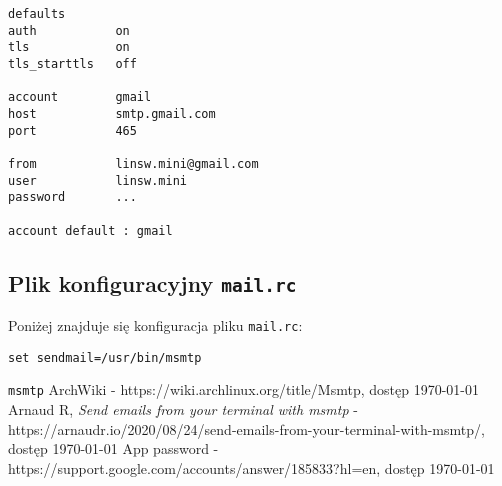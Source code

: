 \documentclass{article}
\begin{document}
\begin{lstlisting}[language=msmtprc, caption=Plik konfiguracyjny \texttt{msmtp}., label=lst:msmtprc]
defaults
auth           on
tls            on
tls_starttls   off

account        gmail
host           smtp.gmail.com
port           465

from           linsw.mini@gmail.com
user           linsw.mini
password       ...

account default : gmail
\end{lstlisting}

\subsection{Plik konfiguracyjny \texttt{mail.rc}}

Poniżej znajduje się konfiguracja pliku \texttt{mail.rc}:

\begin{lstlisting}[language=msmtprc, caption=Plik konfiguracyjny \texttt{mail.rc}., label=lst:mailrc]
set sendmail=/usr/bin/msmtp
\end{lstlisting}


\begin{thebibliography}{9}
 \texttt{msmtp} ArchWiki - https://wiki.archlinux.org/title/Msmtp, dostęp \today
{} Arnaud R, \textit{Send emails from your terminal with msmtp} - https://arnaudr.io/2020/08/24/send-emails-from-your-terminal-with-msmtp/, dostęp \today
{} App password - https://support.google.com/accounts/answer/185833?hl=en, dostęp \today
\end{thebibliography}
\end{document}
